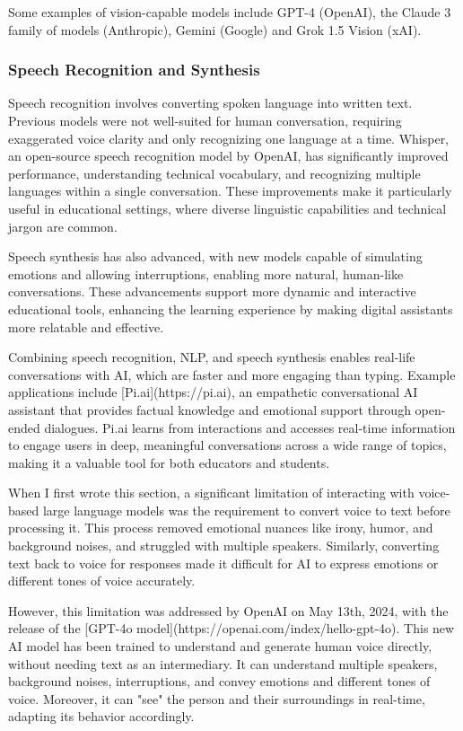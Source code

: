 \documentclass{article}
\begin{document}
Some examples of vision-capable models include GPT-4 (OpenAI), the Claude 3 family of models (Anthropic), Gemini (Google) and Grok 1.5 Vision (xAI).

\subsubsection{Speech Recognition and Synthesis}
Speech recognition involves converting spoken language into written text. Previous models were not well-suited for human conversation, requiring exaggerated voice clarity and only recognizing one language at a time. Whisper, an open-source speech recognition model by OpenAI, has significantly improved performance, understanding technical vocabulary, and recognizing multiple languages within a single conversation. These improvements make it particularly useful in educational settings, where diverse linguistic capabilities and technical jargon are common.

Speech synthesis has also advanced, with new models capable of simulating emotions and allowing interruptions, enabling more natural, human-like conversations. These advancements support more dynamic and interactive educational tools, enhancing the learning experience by making digital assistants more relatable and effective.

Combining speech recognition, NLP, and speech synthesis enables real-life conversations with AI, which are faster and more engaging than typing. Example applications include [Pi.ai](https://pi.ai), an empathetic conversational AI assistant that provides factual knowledge and emotional support through open-ended dialogues. Pi.ai learns from interactions and accesses real-time information to engage users in deep, meaningful conversations across a wide range of topics, making it a valuable tool for both educators and students.

When I first wrote this section, a significant limitation of interacting with voice-based large language models was the requirement to convert voice to text before processing it. This process removed emotional nuances like irony, humor, and background noises, and struggled with multiple speakers. Similarly, converting text back to voice for responses made it difficult for AI to express emotions or different tones of voice accurately.

However, this limitation was addressed by OpenAI on May 13th, 2024, with the release of the [GPT-4o model](https://openai.com/index/hello-gpt-4o). This new AI model has been trained to understand and generate human voice directly, without needing text as an intermediary. It can understand multiple speakers, background noises, interruptions, and convey emotions and different tones of voice. Moreover, it can "see" the person and their surroundings in real-time, adapting its behavior accordingly.
\end{document}
